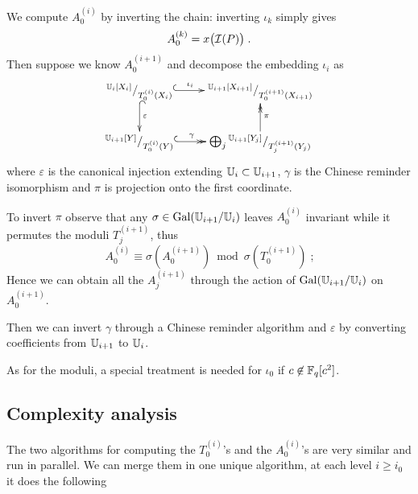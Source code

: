 We compute $A_0^{(i)}$ by inverting the chain: inverting $\iota_k$
simply gives
\begin{equation}
  \label{eq:A_0^k}
  A_0^{(k)} = x\bigl(\mathcal{I}(P)\bigr)
  \;\text{.}
\end{equation}
Then suppose we know $A_0^{(i+1)}$ and decompose the embedding
$\iota_i$ as
\begin{equation}
  \xymatrix{
    ^{\U_i[X_i]}/_{T_0^{(i)}(X_i)} \ar@{^{(}->}[r]^-{\iota_i} \ar@{^{(}->}[d]^{\varepsilon} &
    ^{\U_{i+1}[X_{i+1}]}/_{T_0^{(i+1)}(X_{i+1})} \\
    ^{\U_{i+1}[Y]}/_{T_0^{(i)}(Y)} \ar@{^{(}->>}[r]^-{\gamma} &
    \bigoplus_j {}^{\U_{i+1}[Y_{j}]}/_{T_j^{(i+1)}(Y_{j})} \ar@{->>}[u]_{\pi}
  }
\end{equation}
where $\varepsilon$ is the canonical injection extending
$\mathbb{U}_i\subset\mathbb{U}_{i+1}$, $\gamma$ is the Chinese reminder isomorphism
and $\pi$ is projection onto the first coordinate.

To invert $\pi$ observe that any $\sigma\in\operatorname{Gal}(\mathbb{U}_{i+1}/\mathbb{U}_i)$ leaves
$A_0^{(i)}$ invariant while it permutes the moduli $T_j^{(i+1)}$, thus
\begin{equation}
  A_0^{(i)} \equiv \sigma\left(A_0^{(i+1)}\right)
  \bmod \sigma\left(T_0^{(i+1)}\right)
  \;\text{;}
\end{equation}
Hence we can obtain all the $A_j^{(i+1)}$ through the action of
$\operatorname{Gal}(\mathbb{U}_{i+1}/\mathbb{U}_i)$ on $A_0^{(i+1)}$.

Then we can invert $\gamma$ through a Chinese reminder algorithm
\cite[$\S$10.3]{vzGG} and $\varepsilon$ by converting coefficients from
$\mathbb{U}_{i+1}$ to $\mathbb{U}_i$.

As for the moduli, a special treatment is needed for $\iota_0$ if
$c\not\in\mathbb{F}_q[c^2]$.


\subsection{Complexity analysis}
\label{sec:C2-AS-FI:complexity}

The two algorithms for computing the $T_{0}^{(i)}$'s and the
$A_{0}^{(i)}$'s are very similar and run in parallel. We can merge
them in one unique algorithm, at each level $i\ge i_0$ it does the
following


